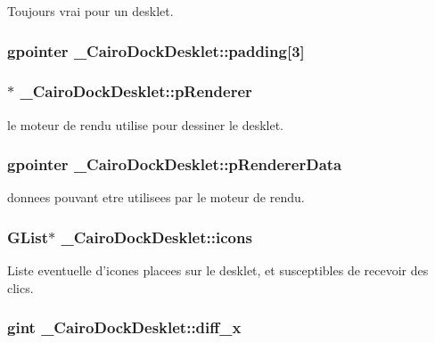 Toujours vrai pour un desklet. 

\subsubsection{\setlength{\rightskip}{0pt plus 5cm}gpointer {\bf \_\-CairoDockDesklet::padding}[3]}\label{struct__CairoDockDesklet_34404848c82c0aeb651556d795f5a7b4}


\subsubsection{$\ast$ {\bf \_\-CairoDockDesklet::pRenderer}}\label{struct__CairoDockDesklet_3c64b2a30de6c803d0a6471a9b6bdabd}


le moteur de rendu utilise pour dessiner le desklet. 

\subsubsection{\setlength{\rightskip}{0pt plus 5cm}gpointer {\bf \_\-CairoDockDesklet::pRendererData}}\label{struct__CairoDockDesklet_a145f3f671017ff4ce624f4c3fbb65c4}


donnees pouvant etre utilisees par le moteur de rendu. 

\subsubsection{\setlength{\rightskip}{0pt plus 5cm}GList$\ast$ {\bf \_\-CairoDockDesklet::icons}}\label{struct__CairoDockDesklet_dac2d8199300450e9f36514dc1d67442}


Liste eventuelle d'icones placees sur le desklet, et susceptibles de recevoir des clics. 

\subsubsection{\setlength{\rightskip}{0pt plus 5cm}gint {\bf \_\-CairoDockDesklet::diff\_\-x}}\label{struct__CairoDockDesklet_4eb3967a97819957d519187f044e9a4c}


